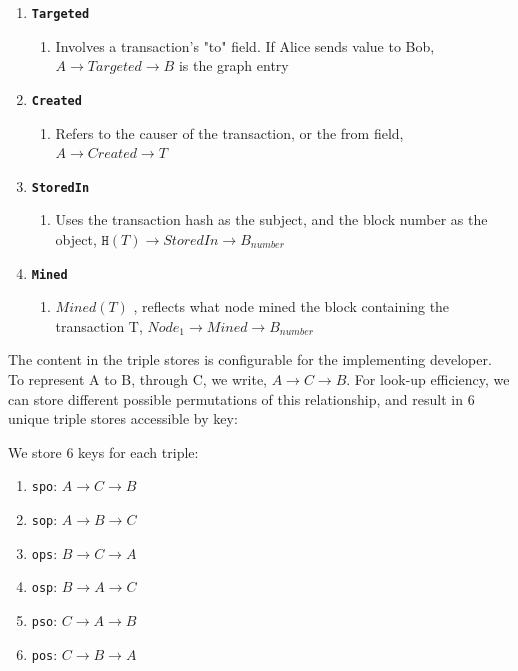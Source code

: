 \documentclass[12pt, titlepage, twocolumn]{report}
\begin{document}
\begin{enumerate}
	\item \texttt{\textbf{Targeted}}
	\begin{enumerate}
		\item Involves a transaction's "to" field. If Alice sends value to Bob, \(A \rightarrow Targeted \rightarrow B\) is the graph entry
	\end{enumerate}
	\item \texttt{\textbf{Created}}
	\begin{enumerate}
		\item Refers to the causer of the transaction, or the from field, \(A \rightarrow Created \rightarrow T\)
	\end{enumerate}
	\item \texttt{\textbf{StoredIn}}
	\begin{enumerate}
		\item  Uses the transaction hash as the subject, and the block number as the object, \(\texttt{H}(T) \rightarrow StoredIn \rightarrow B_{number}\)
	\end{enumerate}
	\item \texttt{\textbf{Mined}}
	\begin{enumerate}
		\item \(Mined(T)\) , reflects what node mined the block containing the transaction T, \(Node_1 \rightarrow Mined \rightarrow B_{number}\)
	\end{enumerate}
\end{enumerate}

The content in the triple stores is configurable for the implementing developer. To represent A to B, through C, we write, \(A \rightarrow C \rightarrow B\). For look-up efficiency, we can store different possible permutations of this relationship, and result in 6 unique triple stores accessible by key: 

We store 6 keys for each triple:
\begin{enumerate}
	\item \texttt{spo}: \(A \rightarrow C \rightarrow B\)
	\item \texttt{sop}: \(A \rightarrow B \rightarrow C\)
	\item \texttt{ops}: \(B \rightarrow C \rightarrow A\)
	\item \texttt{osp}: \(B \rightarrow A \rightarrow C\)
	\item \texttt{pso}: \(C \rightarrow A \rightarrow B\)
	\item \texttt{pos}: \(C \rightarrow B \rightarrow A\)
\end{enumerate}
\end{document}
